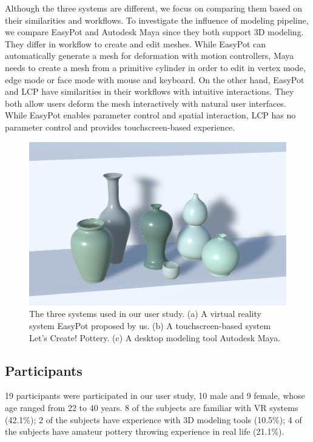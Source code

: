\documentclass{svjour3}                     %
\begin{document}
Although the three systems are different, we focus on comparing them based on their similarities and workflows.
To investigate the influence of modeling pipeline, we compare EasyPot and Autodesk Maya since they both support 3D modeling. They differ in workflow to create and edit meshes. While EasyPot can automatically generate a mesh for deformation with motion controllers, Maya needs to create a mesh from a primitive cylinder in order to edit in vertex mode, edge mode or face mode with mouse and keyboard. 
On the other hand, EasyPot and LCP have similarities in their workflows with intuitive interactions. They both allow users deform the mesh interactively with natural user interfaces. While EasyPot enables parameter control and spatial interaction, LCP has no parameter control and provides touchscreen-based experience.
\begin{figure}
\includegraphics[width=\textwidth]{fig11}
\caption{The three systems used in our user study. (a) A virtual reality system EasyPot proposed by us. (b) A touchscreen-based system Let's Create! Pottery. (c) A desktop modeling tool Autodesk Maya.}
\label{fig:sys}
\end{figure}

\subsection{Participants}
\label{sec:6.2}
19 participants were participated in our user study, 10 male and 9 female, whose age ranged from 22 to 40 years. 8 of the subjects are familiar with VR systems (42.1\%); 2 of the subjects have experience with 3D modeling tools (10.5\%); 4 of the subjects have amateur pottery throwing experience in real life (21.1\%).
\end{document}
